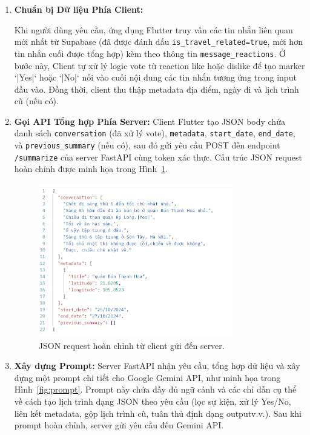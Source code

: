\begin{enumerate}
    \item \textbf{Chuẩn bị Dữ liệu Phía Client:}

    Khi người dùng yêu cầu, ứng dụng Flutter truy vấn các tin nhắn liên quan mới nhất từ Supabase (đã được đánh dấu \texttt{is\_travel\_related=true}, mới hơn tin nhắn cuối được tổng hợp) kèm theo thông tin \texttt{message\_reactions}. Ở bước này, Client tự xử lý logic vote từ reaction like hoặc dislike để tạo marker `|Yes|` hoặc `|No|` nối vào cuối nội dung các tin nhắn tương ứng trong input đầu vào. Đồng thời, client thu thập metadata địa điểm, ngày đi và lịch trình cũ (nếu có).


    \item \textbf{Gọi API Tổng hợp Phía Server:} Client Flutter tạo JSON body chứa danh sách \texttt{conversation} (đã xử lý vote), \texttt{metadata}, \texttt{start\_date}, \texttt{end\_date}, và \texttt{previous\_summary} (nếu có), sau đó gửi yêu cầu POST đến endpoint \texttt{/summarize} của server FastAPI cùng token xác thực. Cấu trúc JSON request hoàn chỉnh được minh họa trong Hình~\ref{fig:input}. %
    \begin{figure}[H]
        \centering
        \includegraphics[width=0.8\textwidth]{figures/c4/input.png}
        \caption{JSON request hoàn chỉnh từ client gửi đến server.}
        \label{fig:input}
    \end{figure}
    \item \textbf{Xây dựng Prompt:} Server FastAPI nhận yêu cầu, tổng hợp dữ liệu và xây dựng một prompt chi tiết cho Google Gemini API, như minh họa trong Hình~\ref{fig:prompt}. Prompt này chứa đầy đủ ngữ cảnh và các chỉ dẫn cụ thể về cách tạo lịch trình dạng JSON theo yêu cầu (lọc sự kiện, xử lý Yes/No, liên kết metadata, gộp lịch trình cũ, tuân thủ định dạng outputv.v.). Sau khi prompt hoàn chỉnh, server gửi yêu cầu đến Gemini API. %

\end{enumerate}
